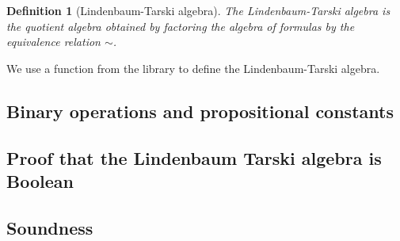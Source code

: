 \documentclass[titlepage]{article}
\newtheorem{definition}{Definition}[section]
\begin{document}
\begin{definition}[Lindenbaum-Tarski algebra]
    The Lindenbaum-Tarski algebra is the quotient algebra obtained by factoring the algebra of formulas by the equivalence relation $\sim$.
\end{definition}
We use a function from the \CubicalAgda library to define the Lindenbaum-Tarski algebra.


\subsection{Binary operations and propositional constants}




\subsection{Proof that the Lindenbaum Tarski algebra is Boolean}
\subsection{Soundness}











\newpage

\end{document}
